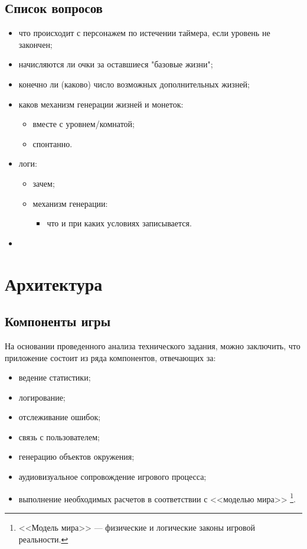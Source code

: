 \documentclass[12pt,a4paper,fullpage,titlepage]{article}
\begin{document}
\subsection{Список вопросов}
\begin{itemize}
	\item что происходит с персонажем по истечении таймера, если уровень не закончен;
	\item начисляются ли очки за оставшиеся "базовые жизни";
	\item конечно ли (каково) число возможных дополнительных жизней;
	\item каков механизм генерации жизней и монеток:
	\begin{itemize}
		\item вместе с уровнем/комнатой;
		\item спонтанно.
	\end{itemize}
	\item логи:
	\begin{itemize}
		\item зачем;
		\item механизм генерации:
		\begin{itemize}
			\item что и при каких условиях записывается.
		\end{itemize}
	\end{itemize}
	\item
\end{itemize}


\newpage
\section{Архитектура}

\subsection{Компоненты игры}
На основании проведенного анализа технического задания, можно заключить, что приложение состоит из ряда компонентов, отвечающих за:
\begin{itemize}
	\item ведение статистики;
	\item логирование;
	\item отслеживание ошибок;
	\item связь с пользователем;
	\item генерацию объектов окружения;
	\item аудиовизуальное сопровождение игрового процесса;
	\item выполнение необходимых расчетов в соответствии с <<моделью мира>> \footnote{<<Модель мира>> --- физические и логические законы игровой реальности.}.\\
\end{itemize}
\end{document}
